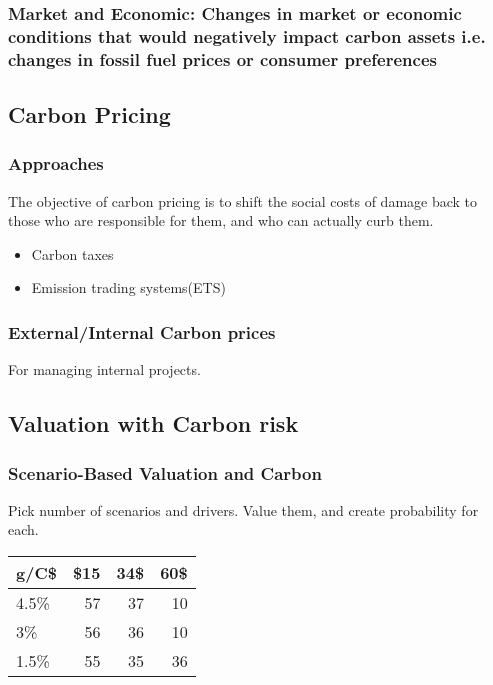 \documentclass[11pt]{article}
\begin{document}
\subsubsection*{\textbf{Market and Economic}: Changes in market or economic conditions that would negatively impact carbon assets i.e. changes in fossil fuel prices or consumer preferences}
\label{sec:orgeb557e7}
\subsection*{Carbon Pricing}
\label{sec:orgc8c6df1}
\subsubsection*{Approaches}
\label{sec:org4d33ab4}
The objective of carbon pricing is to shift the social costs of damage back to those who are responsible for them, and who can actually curb them.\\
\begin{itemize}
\item Carbon taxes
\label{sec:org4ca20db}
\item Emission trading systems(ETS)
\label{sec:orgd628626}
\end{itemize}
\subsubsection*{External/Internal Carbon prices}
\label{sec:org651f4a1}
For managing internal projects.\\
\subsection*{Valuation with Carbon risk}
\label{sec:orgcc265fb}
\subsubsection*{Scenario-Based Valuation and Carbon}
\label{sec:org7f15ce2}
Pick number of scenarios and drivers. Value them, and create probability for each.\\
\begin{center}
\begin{tabular}{lrrr}
\hline
g/C\$ & \$15 & 34\$ & 60\$\\
\hline
4.5\% & 57 & 37 & 10\\
3\% & 56 & 36 & 10\\
1.5\% & 55 & 35 & 36\\
\hline
\end{tabular}
\end{center}
\end{document}
